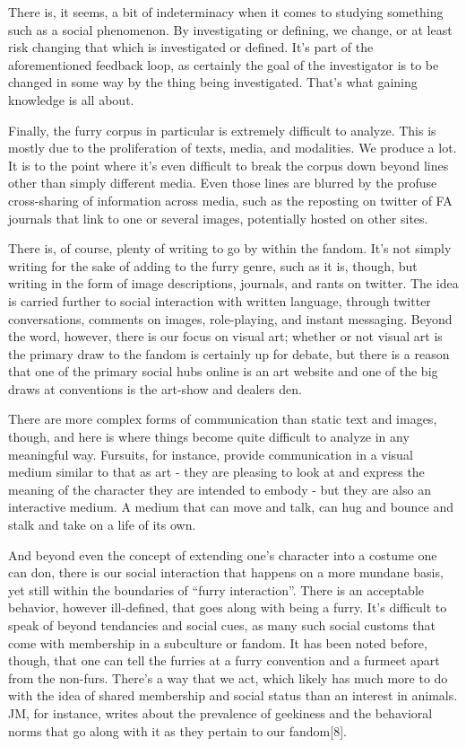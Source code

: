 There is, it seems, a bit of indeterminacy when it comes to studying something such as a social phenomenon. By investigating or defining, we change, or at least risk changing that which is investigated or defined. It's part of the aforementioned feedback loop, as certainly the goal of the investigator is to be changed in some way by the thing being investigated. That's what gaining knowledge is all about.

Finally, the furry corpus in particular is extremely difficult to analyze. This is mostly due to the proliferation of texts, media, and modalities. We produce a lot. It is to the point where it's even difficult to break the corpus down beyond lines other than simply different media. Even those lines are blurred by the profuse cross-sharing of information across media, such as the reposting on twitter of FA journals that link to one or several images, potentially hosted on other sites.

There is, of course, plenty of writing to go by within the fandom. It's not simply writing for the sake of adding to the furry genre, such as it is, though, but writing in the form of image descriptions, journals, and rants on twitter. The idea is carried further to social interaction with written language, through twitter conversations, comments on images, role-playing, and instant messaging. Beyond the word, however, there is our focus on visual art; whether or not visual art is the primary draw to the fandom is certainly up for debate, but there is a reason that one of the primary social hubs online is an art website and one of the big draws at conventions is the art-show and dealers den.

There are more complex forms of communication than static text and images, though, and here is where things become quite difficult to analyze in any meaningful way. Fursuits, for instance, provide communication in a visual medium similar to that as art - they are pleasing to look at and express the meaning of the character they are intended to embody - but they are also an interactive medium. A medium that can move and talk, can hug and bounce and stalk and take on a life of its own.

And beyond even the concept of extending one's character into a costume one can don, there is our social interaction that happens on a more mundane basis, yet still within the boundaries of ``furry interaction''. There is an acceptable behavior, however ill-defined, that goes along with being a furry. It's difficult to speak of beyond tendancies and social cues, as many such social customs that come with membership in a subculture or fandom. It has been noted before, though, that one can tell the furries at a furry convention and a furmeet apart from the non-furs. There's a way that we act, which likely has much more to do with the idea of shared membership and social status than an interest in animals. JM, for instance, writes about the prevalence of geekiness and the behavioral norms that go along with it as they pertain to our fandom{[}8{]}.

